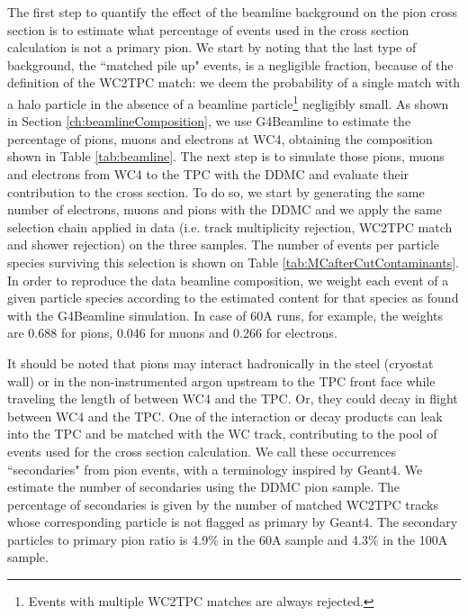 The first step to quantify the effect of the beamline background on the pion cross section is to estimate what percentage of events used in the cross section calculation is not a primary pion.  We start by noting that the last type of background, the ``matched pile up" events, is a negligible fraction, because of the definition of the WC2TPC match: we deem the probability of a single match with a halo particle in the absence of a beamline particle\footnote{ Events with multiple WC2TPC matches are always rejected.} negligibly small. %
As shown in Section \ref{ch:beamlineComposition}, we use G4Beamline to estimate the percentage of pions, muons and electrons at WC4, obtaining the composition shown in Table \ref{tab:beamline}. The next step is to simulate those pions, muons and electrons from WC4 to the TPC with the DDMC and evaluate their contribution to the cross section. To do so, we start by generating the same number of electrons, muons and pions with the DDMC and we apply the same selection chain applied in data (i.e. track multiplicity rejection, WC2TPC match and shower rejection) on the three samples. The number of events per particle species surviving this selection is shown on Table \ref{tab:MCafterCutContaminants}. In order to reproduce the data beamline composition, we weight each event of a given particle species according to the estimated content for that species as found with the G4Beamline simulation. In case of 60A runs, for example, the weights are 0.688 for pions,  0.046 for muons  and 0.266 for electrons.


It should be noted that pions may  interact hadronically in the steel (cryostat wall) or in the non-instrumented argon upstream to the TPC front face while traveling the length of between WC4 and the TPC. Or, they could decay in flight between WC4 and the TPC. One of the interaction or decay products can leak into the TPC and be matched with the WC track, contributing to the pool of events used for the cross section calculation. We call these occurrences ``secondaries" from pion events, with a terminology inspired by Geant4.  We estimate the number of secondaries using the DDMC pion sample.  The percentage of secondaries is given by the number of matched WC2TPC tracks whose corresponding particle is not flagged as primary by Geant4.  The secondary particles to primary pion ratio is 4.9\% in the 60A sample and 4.3\% in the 100A sample.





